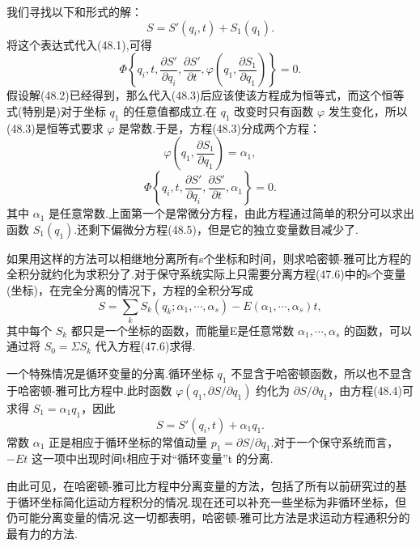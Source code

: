 我们寻找以下和形式的解：
\begin{equation}
  S=S'(q_i,t)+S_1(q_1).
\end{equation}
将这个表达式代入(48.1),可得
\begin{equation}
  \Phi\left\{q_i,t,\frac{\partial S'}{\partial q_i},
  \frac{\partial S'}{\partial t},
  \varphi\left(q_1,\frac{\partial S_1}{\partial q_1}\right)\right\}=0.
\end{equation}
假设解(48.2)已经得到，那么代入(48.3)后应该使该方程成为恒等式，而这个恒等式(特别是)对于坐标
$q_1$
的任意值都成立.在 $q_1$
改变时只有函数 $\varphi$
发生变化，所以(48.3)是恒等式要求 $\varphi$
是常数.于是，方程(48.3)分成两个方程：
\begin{equation}
  \varphi\left(q_1,\frac{\partial S_1}{\partial q_1}\right)=\alpha_1,
\end{equation}
\begin{equation}
  \Phi\left\{q_i,t,\frac{\partial S'}{\partial q_i},
  \frac{\partial S'}{\partial t},\alpha_1\right\}=0.
\end{equation}
其中 $\alpha_1$
是任意常数.上面第一个是常微分方程，由此方程通过简单的积分可以求出函数
$S_1(q_1)$.还剩下偏微分方程(48.5)，但是它的独立变量数目减少了.

如果用这样的方法可以相继地分离所有s个坐标和时间，则求哈密顿-雅可比方程的全积分就约化为求积分了.对于保守系统实际上只需要分离方程(47.6)中的s个变量(坐标)，在完全分离的情况下，方程的全积分写成
\begin{equation}
  S=\sum_k S_k(q_k;\alpha_1,\cdots,\alpha_s)
  -E(\alpha_1,\cdots,\alpha_s)t,
\end{equation}
其中每个 $S_k$
都只是一个坐标的函数，而能量E是任意常数 $\alpha_1,\cdots,\alpha_s$
的函数，可以通过将 $S_0=\Sigma S_k$ 代入方程(47.6)求得.

一个特殊情况是循环变量的分离.循环坐标 $q_1$
不显含于哈密顿函数，所以也不显含于哈密顿-雅可比方程中.此时函数
$\varphi(q_1,\partial S/\partial q_1)$ 约化为 $\partial S/\partial q_1$，由方程(48.4)可求得
$S_1=\alpha_1 q_1$，因此
\begin{equation}
  S=S'(q_i,t)+\alpha_1 q_1.
\end{equation}
常数 $\alpha_1$
正是相应于循环坐标的常值动量 $p_1=\partial S/\partial q_1$.对于一个保守系统而言，$-Et$
这一项中出现时间t相应于对“循环变量”t 的分离.

由此可见，在哈密顿-雅可比方程中分离变量的方法，包括了所有以前研究过的基于循环坐标简化运动方程积分的情况.现在还可以补充一些坐标为非循环坐标，但仍可能分离变量的情况.这一切都表明，哈密顿-雅可比方法是求运动方程通积分的最有力的方法.

